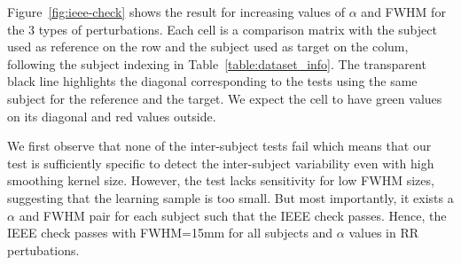 \documentclass{article}
\begin{document}
Figure~\ref{fig:ieee-check} shows the result for increasing values of $\alpha$
and FWHM for the 3 types of perturbations. Each cell is a comparison matrix
with the subject used as reference on the row and the subject used as target on
the colum, following the subject indexing in Table~\ref{table:dataset_info}. The
transparent black line highlights the diagonal corresponding to the tests using
the same subject for the reference and the target. We expect the cell to have
green values on its diagonal and red values outside.

We first observe that none of the inter-subject tests fail which means that our
test is sufficiently specific to detect the inter-subject variability even with
high smoothing kernel size. However, the test lacks sensitivity for low FWHM
sizes, suggesting that the learning sample is too small. But most importantly,
it exists a $\alpha$ and FWHM pair for each subject such that the IEEE check
passes. Hence, the IEEE check passes with FWHM=15mm for all subjects and
$\alpha$ values in RR pertubations.
\end{document}

